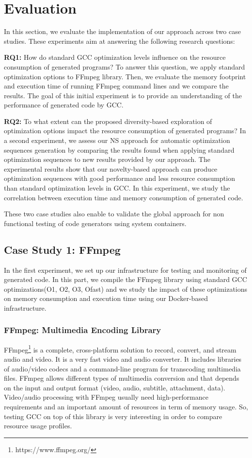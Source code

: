 \section{Evaluation}
In this section, we evaluate the implementation of our approach across two case studies. These experiments aim at answering the following research questions:

\textbf{RQ1:} How do standard GCC optimization levels influence on the resource consumption of generated programs?
To answer this question, we apply standard optimization options to FFmpeg library. Then, we evaluate the memory footprint and execution time of running FFmpeg command lines and we compare the results. The goal of this initial experiment is to
provide an understanding of the performance of generated code by GCC.

\textbf{RQ2:} To what extent can the proposed diversity-based exploration of optimization options impact the resource consumption of generated programs?
In a second experiment, we assess our NS approach for automatic optimization sequences generation by comparing the results found when applying standard optimization sequences to new results provided by our approach. The experimental results show that our novelty-based approach can produce optimization sequences with good performance and less resource consumption
than standard optimization levels in GCC. In this experiment, we study the correlation between execution time and memory consumption of generated code.

These two case studies  also enable to validate the global approach for non functional testing of code generators using system containers. 



\subsection{Case Study 1: FFmpeg}
In the first experiment, we set up our infrastructure for testing and monitoring of generated code. In this part, we compile the FFmpeg library using standard GCC optimizations(O1, O2, O3, Ofast) and we study the impact of these optimizations on memory consumption and execution time using our Docker-based infrastructure.

\subsubsection{FFmpeg: Multimedia Encoding Library}
FFmpeg\footnote{https://www.ffmpeg.org/} is a complete, cross-platform solution to record, convert, and stream audio and video. It is a very fast video and audio converter. It includes libraries of audio/video codecs and a command-line program for transcoding multimedia files. FFmpeg allows different types of multimedia conversion and that depends on the input and output format (video, audio, subtitle, attachment, data). Video/audio processing with FFmpeg usually need high-performance requirements and an important amount of resources in term of memory usage. So, testing GCC on top of this library is very interesting in order to compare resource usage profiles. 
